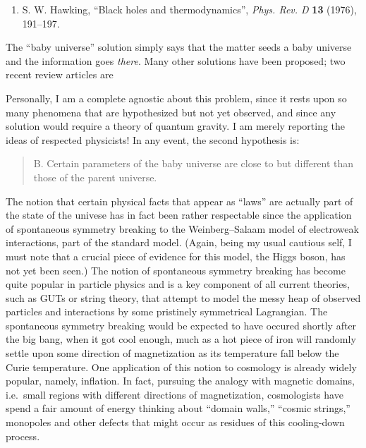 \documentclass{article}
\def\tightlist{}
\renewcommand{\texttt}[1]{%
  \begingroup
  \ttfamily
  \begingroup\lccode`~=`/\lowercase{\endgroup\def~}{/\discretionary{}{}{}}%
  \begingroup\lccode`~=`[\lowercase{\endgroup\def~}{[\discretionary{}{}{}}%
  \begingroup\lccode`~=`.\lowercase{\endgroup\def~}{.\discretionary{}{}{}}%
  \catcode`/=\active\catcode`[=\active\catcode`.=\active
  \scantokens{#1\noexpand}%
  \endgroup
}
\begin{document}
\begin{enumerate}
\def\labelenumi{\arabic{enumi})}
\setcounter{enumi}{1}
\tightlist
\item
  S. W. Hawking, ``Black holes and thermodynamics'', \emph{Phys. Rev. D} \textbf{13} 
  (1976), 191--197.
\end{enumerate}

The ``baby universe'' solution simply says that the matter seeds a baby
universe and the information goes \emph{there}. Many other solutions
have been proposed; two recent review articles are

\noindent
Personally, I am a complete agnostic about this problem, since it rests
upon so many phenomena that are hypothesized but not yet observed, and
since any solution would require a theory of quantum gravity. I am
merely reporting the ideas of respected physicists! In any event, the
second hypothesis is:

\begin{quote}
B. Certain parameters of the baby universe are close to but different
than those of the parent universe.
\end{quote}

 The notion that certain physical
facts that appear as ``laws'' are actually part of the state of the
univese has in fact been rather respectable since the application of
spontaneous symmetry breaking to the Weinberg--Salaam model of electroweak
interactions, part of the standard model. (Again, being my usual
cautious self, I must note that a crucial piece of evidence for this
model, the Higgs boson, has not yet been seen.) The notion of
spontaneous symmetry breaking has become quite popular in particle
physics and is a key component of all current theories, such as GUTs or
string theory, that attempt to model the messy heap of observed
particles and interactions by some pristinely symmetrical Lagrangian.
The spontaneous symmetry breaking would be expected to have occured
shortly after the big bang, when it got cool enough, much as a hot piece
of iron will randomly settle upon some direction of magnetization as its
temperature fall below the Curie temperature. One application of this
notion to cosmology is already widely popular, namely, inflation. In
fact, pursuing the analogy with magnetic domains, i.e.~small regions
with different directions of magnetization, cosmologists have spend a
fair amount of energy thinking about ``domain walls,'' ``cosmic
strings,'' monopoles and other defects that might occur as residues of
this cooling-down process.
\end{document}
